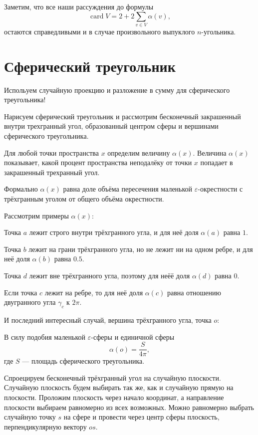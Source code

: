 \documentclass[12pt]{article} %
\theoremstyle{definition} %
\DeclareMathOperator{\card}{card}
\begin{document}
Заметим, что все наши рассуждения до формулы
\[
\card V = 2 + 2 \sum_{v\in V} \alpha(v), 
\]
остаются справедливыми и в случае произвольного выпуклого $n$-угольника. 


\section{Сферический треугольник}

Испольуем случайную проекцию и разложение в сумму для сферического треугольника!

Нарисуем сферический треугольник и рассмотрим бесконечный закрашенный внутри трехгранный угол, 
образованный центром сферы и вершинами сферического треугольника. 


Для любой точки пространства $x$ определим величину $\alpha(x)$. 
Величина $\alpha(x)$ показывает, какой процент пространства неподалёку от точки $x$ попадает в закрашенный трехранный угол.

Формально $\alpha(x)$ равна доле объёма пересечения маленькой $\varepsilon$-окрестности 
с трёхгранным уголом от общего объёма окрестности. 

Рассмотрим примеры $\alpha(x)$:


Точка $a$ лежит строго внутри трёхгранного угла, 
и для неё доля $\alpha(a)$ равна $1$.

Точка $b$ лежит на грани трёхгранного угла, 
но не лежит ни на одном ребре, 
и для неё доля $\alpha(b)$ равна $0.5$.

Точка $d$ лежит вне трёхгранного угла, 
поэтому для неёё доля $\alpha(d)$ равна $0$.

Если точка $c$ лежит на ребре, то для неё доля $\alpha(c)$
равна отношению двугранного угла $\gamma_c$ к $2\pi$.


И последний интересный случай, вершина трёхгранного угла, точка $o$:


В силу подобия маленькой $\varepsilon$-сферы и единичной сферы
\[
\alpha(o) = \frac{S}{4\pi},
\]
где $S$ — площадь сферического треугольника. 

Спроецируем бесконечный трёхгранный угол на случайную плоскости. 
Случайную плоскость будем выбирать так же, как и случайную прямую на плоскости. 
Проложим плоскость через начало координат, а направление плоскости выбираем равномерно из всех возможных. 
Можно равномерно выбрать случайную точку $s$ на сфере и провести 
через центр сферы плоскость, перпендикулярную вектору $os$.
\end{document}
